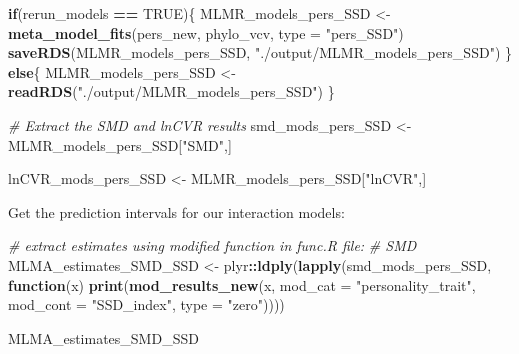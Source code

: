 \documentclass[]{article}
\newenvironment{Shaded}{\begin{snugshade}}{\end{snugshade}}
\newcommand{\KeywordTok}[1]{\textcolor[rgb]{0.13,0.29,0.53}{\textbf{#1}}}
\newcommand{\DataTypeTok}[1]{\textcolor[rgb]{0.13,0.29,0.53}{#1}}
\newcommand{\StringTok}[1]{\textcolor[rgb]{0.31,0.60,0.02}{#1}}
\newcommand{\CommentTok}[1]{\textcolor[rgb]{0.56,0.35,0.01}{\textit{#1}}}
\newcommand{\OtherTok}[1]{\textcolor[rgb]{0.56,0.35,0.01}{#1}}
\newcommand{\ControlFlowTok}[1]{\textcolor[rgb]{0.13,0.29,0.53}{\textbf{#1}}}
\newcommand{\OperatorTok}[1]{\textcolor[rgb]{0.81,0.36,0.00}{\textbf{#1}}}
\newcommand{\NormalTok}[1]{#1}
\begin{document}
\begin{Shaded}
\begin{Highlighting}[]
      \ControlFlowTok{if}\NormalTok{(rerun_models }\OperatorTok{==}\StringTok{ }\OtherTok{TRUE}\NormalTok{)\{}
\NormalTok{      MLMR_models_pers_SSD <-}\StringTok{ }\KeywordTok{meta_model_fits}\NormalTok{(pers_new, phylo_vcv, }\DataTypeTok{type =} \StringTok{"pers_SSD"}\NormalTok{)}
      \KeywordTok{saveRDS}\NormalTok{(MLMR_models_pers_SSD, }\StringTok{"./output/MLMR_models_pers_SSD"}\NormalTok{)}
\NormalTok{    \} }\ControlFlowTok{else}\NormalTok{\{}
\NormalTok{      MLMR_models_pers_SSD <-}\StringTok{ }\KeywordTok{readRDS}\NormalTok{(}\StringTok{"./output/MLMR_models_pers_SSD"}\NormalTok{)}
\NormalTok{    \}  }


  \CommentTok{# Extract the SMD and lnCVR results}
\NormalTok{  smd_mods_pers_SSD <-}\StringTok{ }\NormalTok{MLMR_models_pers_SSD[}\StringTok{"SMD"}\NormalTok{,]}
    
\NormalTok{  lnCVR_mods_pers_SSD <-}\StringTok{ }\NormalTok{MLMR_models_pers_SSD[}\StringTok{"lnCVR"}\NormalTok{,]}
\end{Highlighting}
\end{Shaded}

Get the prediction intervals for our interaction models:

\begin{Shaded}
\begin{Highlighting}[]
  \CommentTok{# extract estimates using modified function in func.R file:}
    \CommentTok{# SMD}
\NormalTok{  MLMA_estimates_SMD_SSD <-}\StringTok{ }\NormalTok{plyr}\OperatorTok{::}\KeywordTok{ldply}\NormalTok{(}\KeywordTok{lapply}\NormalTok{(smd_mods_pers_SSD, }\ControlFlowTok{function}\NormalTok{(x) }
     \KeywordTok{print}\NormalTok{(}\KeywordTok{mod_results_new}\NormalTok{(x, }\DataTypeTok{mod_cat =} \StringTok{"personality_trait"}\NormalTok{, }\DataTypeTok{mod_cont =} \StringTok{"SSD_index"}\NormalTok{, }\DataTypeTok{type =} \StringTok{"zero"}\NormalTok{))))}
    
\NormalTok{    MLMA_estimates_SMD_SSD}
\end{Highlighting}
\end{Shaded}
\end{document}
